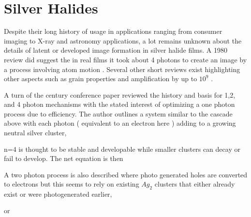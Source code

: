 
\section{Silver Halides}

Despite their long history of usage in applications ranging 
from consumer imaging to X-ray and astronomy applications,
 a lot remains unknown about the
details of latent or developed image formation in silver halide films.
A 1980 review did suggest the in real films it took about 4 photons to
create an image by a process involving atom motion \cite[p. 229]{Bose1980} .
Several other short reviews exist highlighting other aspects
such as grain properties and amplification by up to $10^9$
\cite{Tan_Silver_Halides_Photography_1989}.


A turn of the century conference paper reviewed the history and basis
for 1,2, and 4 photon mechanisms \cite{DBLP:conf/pics/Leubner99} with
the stated interest of optimizing a one photon process due to efficiency.
The author outlines a system similar to the cascade above with
each photon ( equivalent to an electron here ) adding to a growing
neutral silver cluster,

\newcommand{\mjmcee}[2]{{\centering { \cee{#1 \label{#2} }}}}

\mjmcee{  Ag_n + Ag^+ + e^-  -> Ag_{n+1} }{eqn:halides}

n=4 is thought to be stable and developable while smaller clusters
can decay or fail to develop.  The net equation is then



A two photon process is also described where photo generated holes
are converted to electrons but this seems to rely on existing
$Ag_2$ clusters that either already exist or were photogenerated earlier,


or


